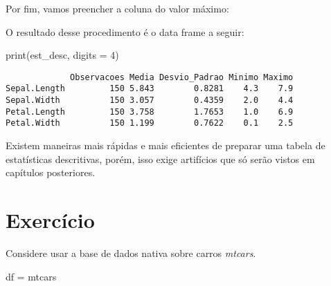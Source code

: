 \documentclass[
  letterpaper,
  DIV=11,
  numbers=noendperiod]{scrreprt}
\newenvironment{Shaded}{\begin{snugshade}}{\end{snugshade}}
\newcommand{\AttributeTok}[1]{\textcolor[rgb]{0.40,0.45,0.13}{#1}}
\newcommand{\DecValTok}[1]{\textcolor[rgb]{0.68,0.00,0.00}{#1}}
\newcommand{\FunctionTok}[1]{\textcolor[rgb]{0.28,0.35,0.67}{#1}}
\newcommand{\NormalTok}[1]{\textcolor[rgb]{0.00,0.23,0.31}{#1}}
\newcommand{\OtherTok}[1]{\textcolor[rgb]{0.00,0.23,0.31}{#1}}
\newcommand{\SpecialCharTok}[1]{\textcolor[rgb]{0.37,0.37,0.37}{#1}}
\newcommand{\StringTok}[1]{\textcolor[rgb]{0.13,0.47,0.30}{#1}}
\begin{document}
Por fim, vamos preencher a coluna do valor máximo:

\begin{Shaded}
\end{Shaded}

O resultado desse procedimento é o data frame a seguir:

\begin{Shaded}
\begin{Highlighting}[]
\FunctionTok{print}\NormalTok{(est\_desc, }\AttributeTok{digits =} \DecValTok{4}\NormalTok{)}
\end{Highlighting}
\end{Shaded}

\begin{verbatim}
             Observacoes Media Desvio_Padrao Minimo Maximo
Sepal.Length         150 5.843        0.8281    4.3    7.9
Sepal.Width          150 3.057        0.4359    2.0    4.4
Petal.Length         150 3.758        1.7653    1.0    6.9
Petal.Width          150 1.199        0.7622    0.1    2.5
\end{verbatim}

Existem maneiras mais rápidas e mais eficientes de preparar uma tabela
de estatísticas descritivas, porém, isso exige artifícios que só serão
vistos em capítulos posteriores.

\section{Exercício}\label{exercuxedcio}

Considere usar a base de dados nativa sobre carros \emph{mtcars}.

\begin{Shaded}
\begin{Highlighting}[]
\NormalTok{df }\OtherTok{=}\NormalTok{ mtcars}
\end{Highlighting}
\end{Shaded}
\end{document}
